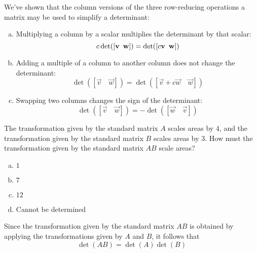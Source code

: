 \begin{applicationActivities}{1}{25}
\begin{fact}
  We've shown that the column versions of the three row-reducing operations
  a matrix may be used to simplify a determinant:
  \begin{enumerate}[(a)]
  \item Multiplying a column by a scalar multiplies the
        determinant by that scalar:
        \[c\det([\vec{v}\hspace{0.5em} \vec{w}])=
        \det([c\vec{v}\hspace{0.5em} \vec{w}])\]
  \item Adding a multiple of a column to another column does not
        change the determinant:
        \[\det([\vec{v}\hspace{1em}\vec{w}])=
        \det([\vec{v}+c\vec{w}\hspace{1em}\vec{w}])\]
  \item Swapping two columns changes the sign of the determinant:
        \[\det([\vec{v}\hspace{1em}\vec{w}])=
        -\det([\vec{w}\hspace{1em}\vec{v}])\]
  \end{enumerate}
\end{fact}

\begin{activity}{5}
  The transformation given by the standard matrix \(A\) scales areas by
  \(4\), and the transformation given by the standard matrix \(B\) scales
  areas by \(3\). How must the transformation given by the standard matrix
  \(AB\) scale areas?
  \begin{enumerate}[(a)]
  \item \(1\)
  \item \(7\)
  \item \(12\)
  \item Cannot be determined
  \end{enumerate}

\end{activity}

\begin{fact}
Since the transformation given by the standard matrix \(AB\) is obtained
by applying the transformations given by \(A\) and \(B\), it follows that \[\det(AB)=\det(A)\det(B)\]
%
%
\end{fact}


\end{applicationActivities}
